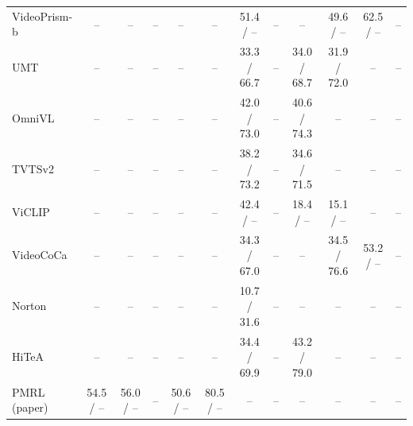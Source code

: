 \begin{table}[t]
\begin{tabular}{lccccccccccc}
VideoPrism-b & -- & -- & -- & -- & -- & 51.4 / -- & -- & -- & 49.6 / -- & 62.5 / -- & -- \\
UMT & -- & -- & -- & -- & -- & 33.3 / 66.7 & -- & 34.0 / 68.7 & 31.9 / 72.0 & -- & -- \\
OmniVL & -- & -- & -- & -- & -- & 42.0 / 73.0 & -- & 40.6 / 74.3 & -- & -- & -- \\
TVTSv2 & -- & -- & -- & -- & -- & 38.2 / 73.2 & -- & 34.6 / 71.5 & -- & -- & -- \\
ViCLIP & -- & -- & -- & -- & -- & 42.4 / -- & -- & 18.4 / -- & 15.1 / -- & -- & -- \\
VideoCoCa & -- & -- & -- & -- & -- & 34.3 / 67.0 & -- & -- & 34.5 / 76.6 & 53.2 / -- & -- \\
Norton & -- & -- & -- & -- & -- & 10.7 / 31.6 & -- & -- & -- & -- & -- \\
HiTeA & -- & -- & -- & -- & -- & 34.4 / 69.9 & -- & 43.2 / 79.0 & -- & -- & -- \\
PMRL (paper) & 54.5 / -- & 56.0 / -- & -- & 50.6 / -- & 80.5 / -- & -- & -- & -- & -- & -- & -- \\
\bottomrule
\end{tabular}
\end{table}
